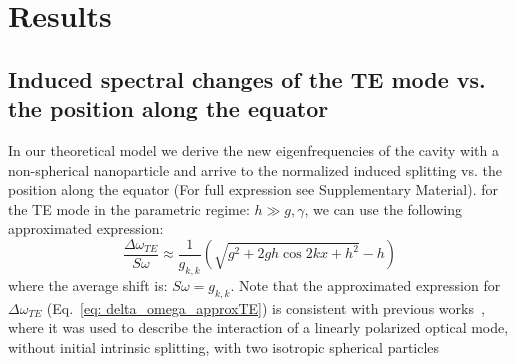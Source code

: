\documentclass[journal=jacsat,manuscript=article]{achemso}
\begin{document}
\section{Results}

\subsection{Induced spectral changes of the TE mode vs. the position along the equator}

In our theoretical model we derive the new eigenfrequencies of the cavity with a non-spherical nanoparticle and arrive to the normalized induced splitting vs. the position along the equator (For full expression see Supplementary Material). for the TE mode in the parametric regime: $h\gg g, \gamma$, we can use the following approximated expression:
\begin{equation}
\frac{\Delta \omega_{TE}}{S\omega}  \approx \frac{1}{g_{k,k}}(\sqrt{ g^2 + 2  g h \cos{2 k x}  + h^2}-h)
\label{eq: delta_omega_approxTE}
\end{equation}
where the average shift is: $\textit{S}\omega=g_{k,k}$.
Note that the approximated expression for $\Delta \omega_{TE} $ (Eq.~\ref{eq: delta_omega_approxTE}) is consistent with previous works~\cite{he2013statistics}, where it was used to describe the interaction of a linearly polarized optical mode, without initial intrinsic splitting, with two isotropic spherical particles
\end{document}

